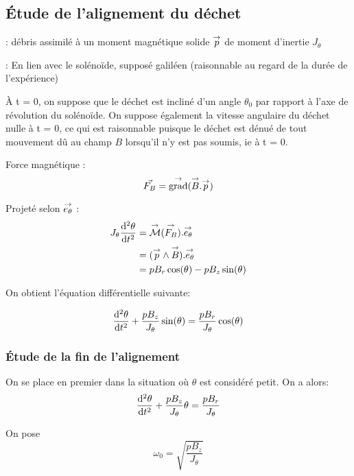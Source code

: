 \documentclass{report}
\begin{document}
\subsection{Étude de l'alignement du déchet}

: {débris assimilé à un moment magnétique solide $\overset{\to}{p}$ de moment d'inertie $J_\theta$}

: En lien avec le solénoïde, supposé galiléen (raisonnable au regard de la durée de l'expérience)


À t = 0, on suppose que le déchet est incliné d'un angle $\theta_0$ par rapport à l'axe de révolution du solénoïde. On suppose également la vitesse angulaire du déchet nulle à t = 0, ce qui est raisonnable puisque le déchet est dénué de tout mouvement dû au champ $B$ lorsqu'il n'y est pas soumis, ie à t = 0.


Force magnétique :
$$\vec{F_B} = \overset{\to}{\text{grad}}(\overset{\to}{B}.\overset{\to}{p})$$


Projeté selon $\overset{\to}{e_\theta}$ :
\begin{align*}
J_\theta \frac{\mathrm{d^2}\theta}{\mathrm{d}t^2} &= \overset{\to}{\mathcal{M}}(\overset{\to}{F_B}) . \overset{\to}{e_\theta} \\
&= (\overset{\to}{p} \wedge \overset{\to}{B}).\overset{\to}{e_\theta}\\
&= pB_r \cos(\theta) - pB_z\sin(\theta)
\end{align*}

On obtient l'équation différentielle suivante:
\begin{prettybox}[blue]
$$\frac{\mathrm{d^2}\theta}{\mathrm{d}t^2} + \frac{pB_z}{J_\theta}\sin(\theta) = \frac{pB_r}{J_\theta} \cos(\theta)$$
\end{prettybox}
\subsubsection{Étude de la fin de l'alignement}
On se place en premier dans la situation où $\theta$ est considéré petit. On a alors:
$$\frac{\mathrm{d^2}\theta}{\mathrm{d}t^2} + \frac{pB_z}{J_\theta}\theta = \frac{pB_r}{J_\theta} $$

On pose $$\omega_0 = \sqrt{\frac{pB_z}{J_\theta}}$$

\end{document}
